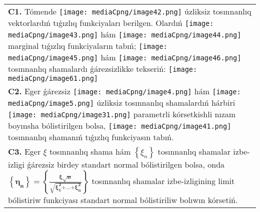 \documentclass{article}
\begin{document}
\begin{tabular}{m{17cm}}
 \\
\textbf{C1.} Tómende \texttt{[image: mediaCpng/image42.png]} úzliksiz tosınnanlıq vektorlardıń tıǵızlıq funkciyaları berilgen. Olardıń \texttt{[image: mediaCpng/image43.png]} hám \texttt{[image: mediaCpng/image44.png]} marginal tıǵızlıq funkciyaların tabıń; \texttt{[image: mediaCpng/image45.png]} hám \texttt{[image: mediaCpng/image46.png]} tosınnanlıq shamalardı ǵárezsizlikke tekseriń: \texttt{[image: mediaCpng/image61.png]}
 \\
\textbf{C2.} Eger ǵárezsiz \texttt{[image: mediaCpng/image4.png]} hám \texttt{[image: mediaCpng/image5.png]} úzliksiz tosınnanlıq shamalardıń hárbiri \texttt{[image: mediaCpng/image31.png]} parametrli kórsetkishli nızam boyınsha bólistirilgen bolsa, \texttt{[image: mediaCpng/image41.png]} tosınnanlıq shamanıń tıǵızlıq funkciyasın tabıń.
 \\
\textbf{C3.} 
Eger \(\xi\) tosınnanlıq shama hám \(\left\{ \xi_{n} \right\}\) tosınnanlıq shamalar izbe-izligi ǵárezsiz birdey standart normal bólistirilgen bolsa, onda \(\left\{ \mathbf{\eta}_{\mathbf{n}} \right\}\mathbf{=}\left\{ \frac{\mathbf{\xi}\sqrt{\mathbf{n}}}{\sqrt{\mathbf{\xi}_{\mathbf{1}}^{\mathbf{2}}\mathbf{+}\mathbf{...}\mathbf{+}\mathbf{\xi}_{\mathbf{n}}^{\mathbf{2}}}} \right\}\) tosınnanlıq shamalar izbe-izligining limit bólistiriw funkciyası standart normal bólistiriliw bolıwın kórsetiń.
 \\

\end{tabular}
\vspace{1cm}
\end{document}
